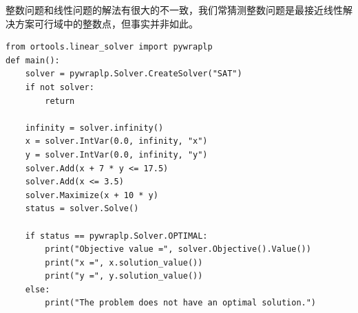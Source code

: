 整数问题和线性问题的解法有很大的不一致，我们常猜测整数问题是最接近线性解决方案可行域中的整数点，但事实并非如此。

\begin{lstlisting}[style=python]
from ortools.linear_solver import pywraplp
def main():
    solver = pywraplp.Solver.CreateSolver("SAT")
    if not solver:
        return

    infinity = solver.infinity()
    x = solver.IntVar(0.0, infinity, "x")
    y = solver.IntVar(0.0, infinity, "y")
    solver.Add(x + 7 * y <= 17.5)
    solver.Add(x <= 3.5)
    solver.Maximize(x + 10 * y)
    status = solver.Solve()

    if status == pywraplp.Solver.OPTIMAL:
        print("Objective value =", solver.Objective().Value())
        print("x =", x.solution_value())
        print("y =", y.solution_value())
    else:
        print("The problem does not have an optimal solution.")
\end{lstlisting}

